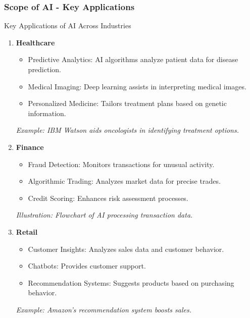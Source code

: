 \documentclass[aspectratio=169]{beamer}
\begin{document}
\begin{frame}[fragile]
    \frametitle{Scope of AI - Key Applications}
    \begin{block}{Key Applications of AI Across Industries}
        \begin{enumerate}
            \item \textbf{Healthcare}
                \begin{itemize}
                    \item Predictive Analytics: AI algorithms analyze patient data for disease prediction.
                    \item Medical Imaging: Deep learning assists in interpreting medical images.
                    \item Personalized Medicine: Tailors treatment plans based on genetic information.
                \end{itemize}
                \textit{Example: IBM Watson aids oncologists in identifying treatment options.}
            
            \item \textbf{Finance}
                \begin{itemize}
                    \item Fraud Detection: Monitors transactions for unusual activity.
                    \item Algorithmic Trading: Analyzes market data for precise trades.
                    \item Credit Scoring: Enhances risk assessment processes.
                \end{itemize}
                \textit{Illustration: Flowchart of AI processing transaction data.}
            
            \item \textbf{Retail}
                \begin{itemize}
                    \item Customer Insights: Analyzes sales data and customer behavior.
                    \item Chatbots: Provides customer support.
                    \item Recommendation Systems: Suggests products based on purchasing behavior.
                \end{itemize}
                \textit{Example: Amazon’s recommendation system boosts sales.}
            

\end{enumerate}
\end{block}
\end{frame}
\end{document}
